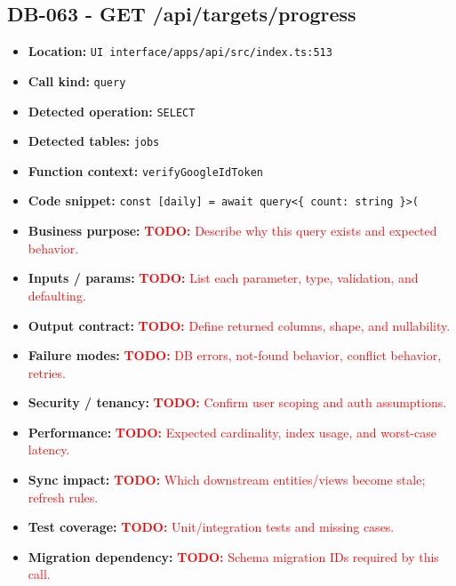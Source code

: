 \documentclass[11pt]{article}
\newcommand{\todoitem}[1]{\textcolor{red}{\textbf{TODO:} #1}}
\begin{document}
\subsection{DB-063 - GET /api/targets/progress}
\begin{itemize}[leftmargin=1.5em]
\item \textbf{Location:} \texttt{UI interface/apps/api/src/index.ts:513}
\item \textbf{Call kind:} \texttt{query}
\item \textbf{Detected operation:} \texttt{SELECT}
\item \textbf{Detected tables:} \texttt{jobs}
\item \textbf{Function context:} \texttt{verifyGoogleIdToken}
\item \textbf{Code snippet:} \texttt{const [daily] = await query<\{ count: string \}>(}
\item \textbf{Business purpose:} \todoitem{Describe why this query exists and expected behavior.}
\item \textbf{Inputs / params:} \todoitem{List each parameter, type, validation, and defaulting.}
\item \textbf{Output contract:} \todoitem{Define returned columns, shape, and nullability.}
\item \textbf{Failure modes:} \todoitem{DB errors, not-found behavior, conflict behavior, retries.}
\item \textbf{Security / tenancy:} \todoitem{Confirm user scoping and auth assumptions.}
\item \textbf{Performance:} \todoitem{Expected cardinality, index usage, and worst-case latency.}
\item \textbf{Sync impact:} \todoitem{Which downstream entities/views become stale; refresh rules.}
\item \textbf{Test coverage:} \todoitem{Unit/integration tests and missing cases.}
\item \textbf{Migration dependency:} \todoitem{Schema migration IDs required by this call.}
\end{itemize}
\end{document}
